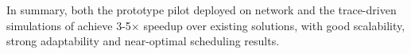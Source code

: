 


In summary, both the prototype pilot deployed on \company network and the trace-driven simulations of \name achieve 3-5$\times$ speedup over existing solutions, with good scalability, strong adaptability and near-optimal scheduling results.


